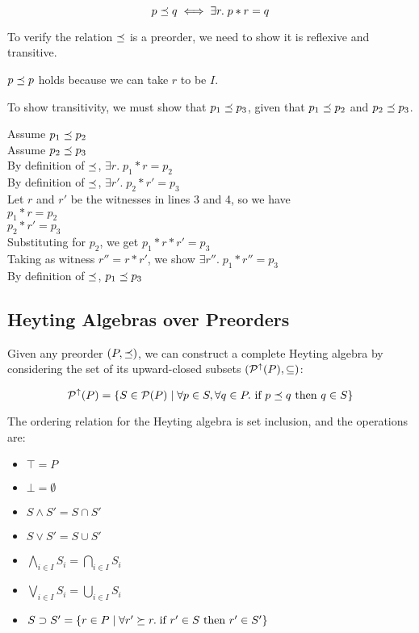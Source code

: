 \begin{displaymath}
p \preceq q \iff \exists r.\; p * r = q
\end{displaymath}

To verify the relation $\preceq$ is a preorder, we need to 
show it is reflexive and transitive. 

$p \preceq p$ holds because we can take $r$ to be $I$. 


To show transitivity, we must show that $p_1 \preceq p_3$, given
that $p_1 \preceq p_2$ and $p_2 \preceq p_3$.

\begin{tabbedproof}
\oo Assume $p_1 \preceq p_2$  \\
\oo Assume $p_2 \preceq p_3$  \\
\ooo By definition of $\preceq$, $\exists r.\; p_1 * r = p_2$ \\
\ooo By definition of $\preceq$, $\exists r'.\; p_2 * r' = p_3$ \\
\ooo Let $r$ and $r'$ be the witnesses in lines 3 and 4, so we have \\
\oooo $p_1 * r = p_2$ \\
\oooo $p_2 * r' = p_3$ \\
\oooo Substituting for $p_2$, we get $p_1 * r * r' = p_3$ \\
\oooo Taking as witness $r'' = r * r'$, we show $\exists r''.\; p_1 * r'' = p_3$ \\
\ooo By definition of $\preceq$, $p_1 \preceq p_3$ \\
\end{tabbedproof}

\subsection{Heyting Algebras over Preorders}

Given any preorder $(P, \preceq)$, we can construct a complete
Heyting algebra by considering the set of its upward-closed subsets
$(\mathcal{P}^{\uparrow}({P}), \subseteq)$:

\begin{displaymath}
\mathcal{P}^{\uparrow}({P}) = 
  \{ S \in \mathcal{P}(P) \;|\;
     \forall p \in S, \forall q \in P. \mbox{ if } p \preceq q \mbox{ then } q \in S 
  \}
\end{displaymath}

The ordering relation for the Heyting algebra is set inclusion, and
the operations are:

\begin{itemize}
\item $\top = P$
\item $\bot = \emptyset$
\item $S \land S' = S \cap S'$
\item $S \vee S' = S \cup S'$
\item $\bigwedge_{i \in I} S_i = \bigcap_{i \in I} S_i$
\item $\bigvee_{i \in I} S_i = \bigcup_{i \in I} S_i$
\item $S \supset S' = \{ r \in P \;|\; \forall r' \succeq r.\; 	
                          \mbox{if } r' \in S \mbox{ then } r' \in S' \}$
\end{itemize}

